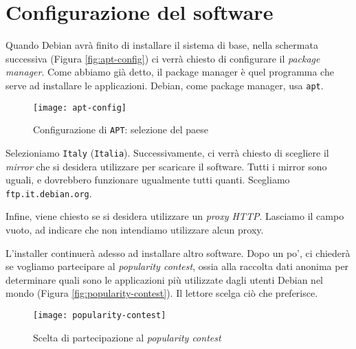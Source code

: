 \section{Configurazione del software}
Quando Debian avrà finito di installare il sistema di base, nella schermata successiva (Figura \vref{fig:apt-config}) ci verrà chiesto di configurare il \textit{package manager}. Come abbiamo già detto, il package manager è quel programma che serve ad installare le applicazioni. Debian, come package manager, usa \texttt{apt}.

\begin{figure}[ht]
	\centering
	\texttt{[image: apt-config]}
	\caption{Configurazione di \texttt{APT}: selezione del paese}
	\label{fig:apt-config}
\end{figure}

Selezioniamo \texttt{Italy} (\texttt{Italia}). Successivamente, ci verrà chiesto di scegliere il \textit{mirror} che si desidera utilizzare per scaricare il software. Tutti i mirror sono uguali, e dovrebbero funzionare ugualmente tutti quanti. Scegliamo \texttt{ftp.it.debian.org}.

Infine, viene chiesto se si desidera utilizzare un \textit{proxy HTTP}. Lasciamo il campo vuoto, ad indicare che non intendiamo utilizzare alcun proxy.

L'installer continuerà adesso ad installare altro software. Dopo un po', ci chiederà se vogliamo partecipare al \textit{popularity contest}, ossia alla raccolta dati anonima per determinare quali sono le applicazioni più utilizzate dagli utenti Debian nel mondo (Figura \vref{fig:popularity-contest}). Il lettore scelga ciò che preferisce.

\begin{figure}[ht]
	\centering
	\texttt{[image: popularity-contest]}
	\caption{Scelta di partecipazione al \textit{popularity contest}}
	\label{fig:popularity-contest}
\end{figure}

